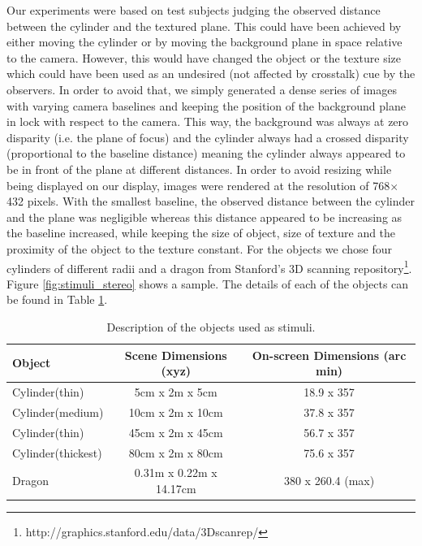 Our experiments were based on test subjects judging the observed distance between the cylinder and the textured plane. This could have been achieved by either moving the cylinder or by moving the background plane in space relative to the camera. However, this would have changed the object or the texture size which could have been used as an undesired (not affected by crosstalk) cue by the observers. In order to avoid that, we simply generated a dense series of images with varying camera baselines and keeping the position of the background plane in lock with respect to the camera. This way, the background was always at zero disparity (i.e. the plane of focus) and the cylinder always had a crossed disparity (proportional to the baseline distance) meaning the cylinder always appeared to be in front of the plane at different distances. In order to avoid resizing while being displayed on our display, images were rendered at the resolution of 768$\times$432 pixels. With the smallest baseline, the observed distance between the cylinder and the plane was negligible whereas this distance appeared to be increasing as the baseline increased, while keeping the size of object, size of texture and the proximity of the object to the texture constant. For the objects we chose four cylinders of different radii and a dragon from Stanford's 3D scanning repository\footnote{http://graphics.stanford.edu/data/3Dscanrep/}. Figure \ref{fig:stimuli_stereo} shows a sample. The details of each of the objects can be found in Table \ref{tab:stimili_desc}.
\begin{table}[ht!]
  \begin{center}
    \caption{Description of the objects used as stimuli.}
    \label{tab:stimili_desc}
    \begin{tabular}{lcc}
      \toprule
      Object & Scene Dimensions (xyz) & On-screen Dimensions (arc min)\\
      \midrule
      Cylinder(thin) & 5cm x 2m x 5cm & 18.9 x 357\\
      Cylinder(medium) & 10cm x 2m x 10cm & 37.8 x 357\\
      Cylinder(thin) & 45cm x 2m x 45cm & 56.7 x 357\\
      Cylinder(thickest) & 80cm x 2m x 80cm & 75.6 x 357 \\
      Dragon & 0.31m x 0.22m x 14.17cm & 380 x 260.4 (max) \\
      \bottomrule
    \end{tabular}
  \end{center}
\end{table}

